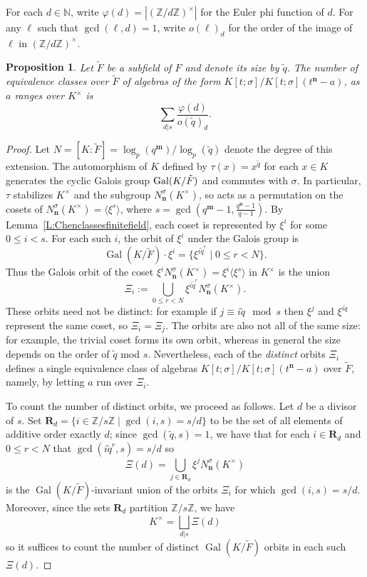 \documentclass[11pt]{amsart}
\theoremstyle{plain}
\newtheorem{proposition}[theorem]{Proposition}
\theoremstyle{definition}
\numberwithin{equation}{section}
\numberwithin{figure}{section}
\newcommand{\NN}{\mathbb{N}}
\newcommand{\os}{{\mathbf{m}}}  %
\newcommand{\de}{{\mathbf{n}}}  %
\newcommand{\Z}{\mathbb{Z}} %
\DeclareMathOperator{\Gal}{Gal}
\begin{document}
For each $d\in \NN$, write $\varphi(d)=|(\Z/d\Z)^\times|$ for the Euler phi function of $d$. For any $\ell$ such that $\gcd(\ell,d)=1$, write $o(\ell)_d$ for the order of the image of $\ell$ in $(\Z/d\Z)^\times$.


\begin{proposition}\label{T:F-tildeequivalencecount}
    Let $\tilde{F}$ be a subfield of $F$ and denote its size by $\tilde{q}$.  The number of equivalence classes over $\tilde{F}$ of algebras of the form $K[t;\sigma]/K[t;\sigma](t^\de-a)$, as $a$ ranges over $K^\times$ is
    $$
    \sum_{d|s}\frac{\varphi(d)}{o(\tilde{q})_d}.
    $$
\end{proposition}

\begin{proof}
    Let $N=[K:\tilde{F}]=\log_p(q^\os)/\log_p(\tilde{q})$ denote the degree of this extension.  The automorphism of $K$ defined by $\tau(x)=x^{\tilde{q}}$ for each $x\in K$ generates the cyclic  Galois group ${\rm Gal}(K/\tilde{F})$ and commutes with $\sigma$.  In particular, $\tau$ stabilizes $K^\times$ and the subgroup $N^\sigma_\de(K^\times)$, so acts as a permutation on  the cosets of $N^\sigma_\de(K^\times)=\langle \xi^s\rangle$, where $s=\gcd\left(q^\os-1, \frac{q^\de-1}{q-1}\right)$.
    By Lemma~\ref{L:Chenclassesfinitefield}, each coset is represented by $\xi^i$ for some $0\leq i <s$.  For each such $i$, the orbit of $\xi^i$ under the Galois group is
    $$
    \Gal(K/\tilde{F})\cdot \xi^i = \{ \xi^{i\tilde{q}^r} \mid 0\leq r < N\}.
    $$
    Thus the Galois orbit of the coset $\xi^i N^\sigma_\de(K^\times) = \xi^i\langle \xi^s\rangle$ in $K^\times$ is the union
    $$
    \Xi_i:=\bigcup_{0\leq r<N}\xi^{i\tilde{q}^r}N^\sigma_\de(K^\times).
    $$
    These orbits need not be distinct: for example if $j\equiv i\tilde{q}\mod s$ then $\xi^j$ and $\xi^{i\tilde{q}}$ represent the same coset, so $\Xi_i=\Xi_{j}$.  The orbits are also not all of the same size: for example, the trivial coset forms its own orbit, whereas in general the size depends on the order of $\tilde{q}$ mod $s$.  Nevertheless, each of the \emph{distinct} orbits  $\Xi_i$ defines a single equivalence class of algebras $K[t;\sigma]/K[t;\sigma](t^\de-a)$ over $\tilde{F}$, namely, by letting $a$ run over $\Xi_i$.

    To count the number of distinct orbits, we proceed as follows.  Let $d$ be a divisor of $s$.  Set ${\mathbf R}_d = \{i\in \Z/s\Z\mid \gcd(i,s)=s/d\}$ to be the set of all elements of additive order exactly $d$; since $\gcd(\tilde{q},s)=1$, we have that for each $i\in {\mathbf R}_d$ and $0\leq r<N$ that $\gcd(i\tilde{q}^r,s)=s/d$ so
    $$
    \Xi(d) = \bigcup_{j\in \mathbf{R}_d} \xi^j N^\sigma_\de(K^\times)
    $$
    is the $\Gal(K/\tilde{F})$-invariant union of the orbits $\Xi_i$ for which $\gcd(i,s)=s/d$.  Moreover, since the sets $\mathbf{R}_d$ partition $
    \Z/s\Z$, we have
    $$
    K^\times = \bigsqcup_{d|s} \Xi(d)
    $$
    so it suffices to count the number of distinct $\Gal(K/\tilde{F})$ orbits in each such $\Xi(d)$.



\end{proof}
\end{document}
